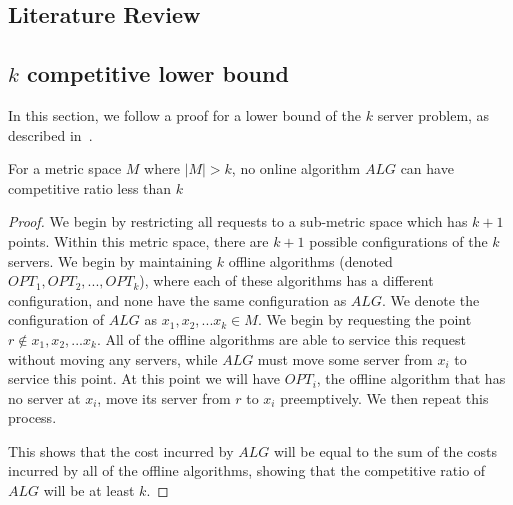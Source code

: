 \subsection{Literature Review}

\subsection{$k$ competitive lower bound}
\label{sec:lowerBound}

In this section, we follow a proof for a lower bound of the $k$ server problem, as described in~\cite{server2009}. 

\begin{lemma}
    For a metric space $M$ where $|M| > k$, no online algorithm $ALG$ can have competitive ratio less than $k$
\end{lemma}

\begin{proof}
    We begin by restricting all requests to a sub-metric space which has $k+1$ points. Within this metric space, there are $k+1$ possible configurations of the $k$ servers. We begin by maintaining $k$ offline algorithms (denoted $OPT_1, OPT_2, ..., OPT_k$), where each of these algorithms has a different configuration, and none have the same configuration as $ALG$. We denote the configuration of $ALG$ as $x_1, x_2, ...x_k \in M$. We begin by requesting the point $r \not \in x_1, x_2, ...x_k$. All of the offline algorithms are able to service this request without moving any servers, while $ALG$ must move some server from $x_i$ to service this point. At this point we will have $OPT_i$, the offline algorithm that has no server at $x_i$, move its server from $r$ to $x_i$ preemptively. We then repeat this process.

    This shows that the cost incurred by $ALG$ will be equal to the sum of the costs incurred by all of the offline algorithms, showing that the competitive ratio of $ALG$ will be at least $k$.
\end{proof}